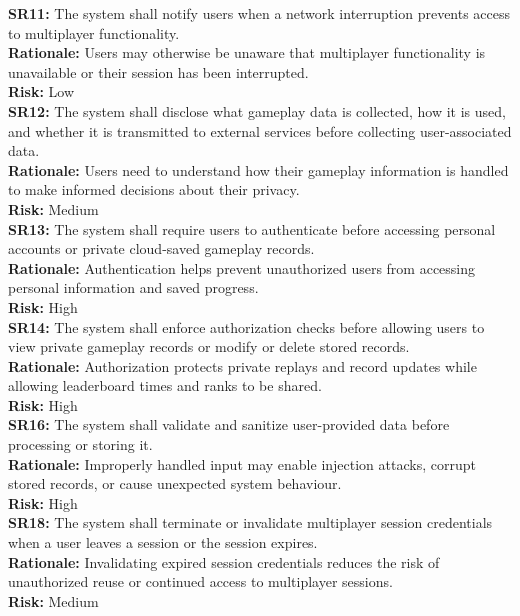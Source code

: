 \documentclass{article}
\newcommand{\reqdef}[1]{\textbf{#1:}}
\begin{document}
\noindent
\reqdef{SR11} The system shall notify users when a network interruption prevents access to multiplayer functionality.\\
\textbf{Rationale:} Users may otherwise be unaware that multiplayer functionality is unavailable or their session has been interrupted.\\
\textbf{Risk:} Low\\[1em]

\noindent
\reqdef{SR12} The system shall disclose what gameplay data is collected, how it is used, and whether it is transmitted to external services before collecting user-associated data.\\
\textbf{Rationale:} Users need to understand how their gameplay information is handled to make informed decisions about their privacy.\\
\textbf{Risk:} Medium\\[1em]

\noindent
\reqdef{SR13} The system shall require users to authenticate before accessing personal accounts or private cloud-saved gameplay records.\\
\textbf{Rationale:} Authentication helps prevent unauthorized users from accessing personal information and saved progress.\\
\textbf{Risk:} High\\[1em]

\noindent
\reqdef{SR14} The system shall enforce authorization checks before allowing users to view private gameplay records or modify or delete stored records.\\
\textbf{Rationale:} Authorization protects private replays and record updates while allowing leaderboard times and ranks to be shared.\\
\textbf{Risk:} High\\[1em]

\noindent
\reqdef{SR16} The system shall validate and sanitize user-provided data before processing or storing it.\\
\textbf{Rationale:} Improperly handled input may enable injection attacks, corrupt stored records, or cause unexpected system behaviour.\\
\textbf{Risk:} High\\[1em]

\noindent
\reqdef{SR18} The system shall terminate or invalidate multiplayer session credentials when a user leaves a session or the session expires.\\
\textbf{Rationale:} Invalidating expired session credentials reduces the risk of unauthorized reuse or continued access to multiplayer sessions.\\
\textbf{Risk:} Medium
\end{document}
